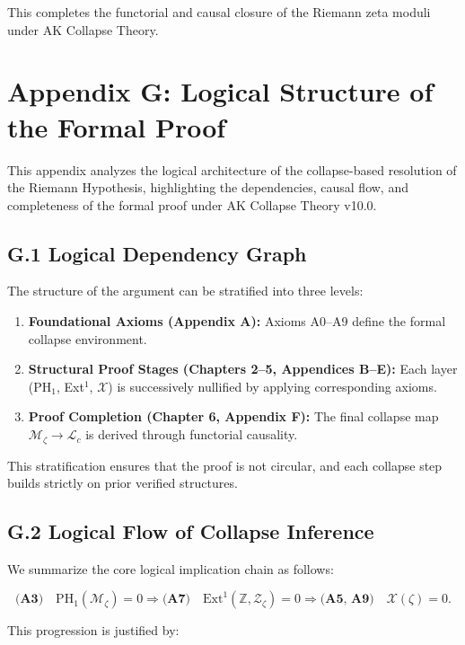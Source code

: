 \documentclass[11pt]{article}
\newcommand{\Sha}{\mathcal{X}}
\begin{document}
This completes the functorial and causal closure of the Riemann zeta moduli under AK Collapse Theory.



\section*{Appendix G: Logical Structure of the Formal Proof}

This appendix analyzes the logical architecture of the collapse-based resolution of the Riemann Hypothesis,  
highlighting the dependencies, causal flow, and completeness of the formal proof under AK Collapse Theory v10.0.

\subsection*{G.1 Logical Dependency Graph}

The structure of the argument can be stratified into three levels:

\begin{enumerate}
    \item \textbf{Foundational Axioms (Appendix A):} Axioms A0–A9 define the formal collapse environment.
    \item \textbf{Structural Proof Stages (Chapters 2–5, Appendices B–E):}  
    Each layer (PH$_1$, Ext$^1$, $\Sha$) is successively nullified by applying corresponding axioms.
    \item \textbf{Proof Completion (Chapter 6, Appendix F):}  
    The final collapse map $\mathcal{M}_\zeta \to \mathcal{L}_c$ is derived through functorial causality.
\end{enumerate}

This stratification ensures that the proof is not circular, and each collapse step builds strictly on prior verified structures.

\subsection*{G.2 Logical Flow of Collapse Inference}

We summarize the core logical implication chain as follows:

\[
\textbf{(A3)}\quad \mathrm{PH}_1(\mathcal{M}_\zeta) = 0 \Rightarrow \textbf{(A7)}\quad \mathrm{Ext}^1(\mathbb{Z}, \mathcal{Z}_\zeta) = 0 \Rightarrow \textbf{(A5, A9)}\quad \Sha(\zeta) = 0.
\]

This progression is justified by:
\end{document}
